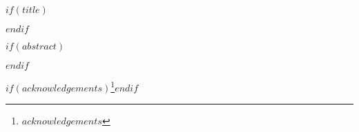 \begin{frontmatter}
$if(title)$
\maketitle
$endif$


$if(abstract)$
\begin{abstract}
$abstract$
\end{abstract}
$endif$

$if(acknowledgements)$\thanks{$acknowledgements$}$endif$

\end{frontmatter}

